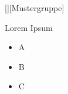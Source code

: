 \documentclass[t]{beamer}
\begin{document}
	[][Mustergruppe]
	\begin{frame}[t]{Lorem Ipsum}
		\begin{itemize}
			\item A
			\item B
			\item C
		\end{itemize}
	\end{frame}
\end{document}
